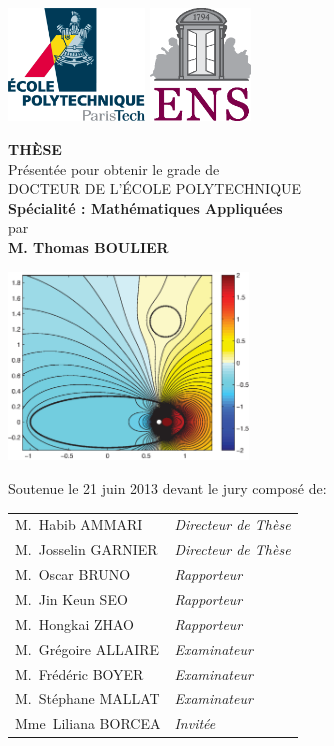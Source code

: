   \includegraphics[height=3cm]{logoX.eps}
  \hfill
  \includegraphics[height=3cm]{logoENS.eps}	
  \vskip 1cm
	\begin{center}
	\Large{\textbf{TH\`ESE}}\\
	\vskip 0.2cm
	Pr\' esent\' ee pour obtenir le grade de\\
	DOCTEUR DE L'\' ECOLE POLYTECHNIQUE\\
	\textbf{Sp\' ecialit\' e : Math\' ematiques Appliqu\' ees}\\
	par\\	
	\textbf{M. Thomas BOULIER}
	\vskip 1.5cm
	
	\vskip 0.3cm
	\includegraphics[height=5cm]{poisson_anomaly.eps}
	\vskip 0.2cm
	
	 Soutenue le 21 juin 2013 devant le jury compos\' e de:\\
\begin{tabular}{ll}
M.\ Habib AMMARI & \textsl{Directeur de Th\`ese}\\
M.\ Josselin GARNIER & \textsl{Directeur de Th\`ese}\\
M.\ Oscar BRUNO & \textsl{Rapporteur}\\
M.\ Jin Keun SEO & \textsl{Rapporteur}\\
M.\ Hongkai ZHAO & \textsl{Rapporteur}\\
M.\ Grégoire ALLAIRE & \textsl{Examinateur}\\
M.\ Frédéric BOYER & \textsl{Examinateur}\\
M.\ Stéphane MALLAT & \textsl{Examinateur}\\
Mme\ Liliana BORCEA & \textsl{Invitée}\\
\end{tabular}	

\end{center}

